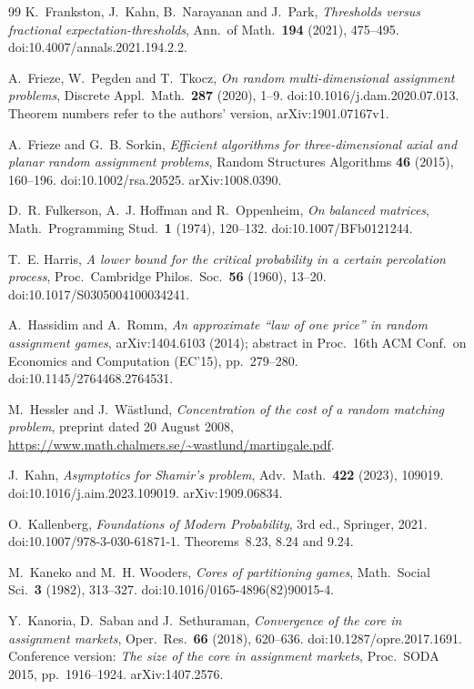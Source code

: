 \documentclass[11pt]{amsart}
\theoremstyle{plain}
\theoremstyle{definition}
\numberwithin{equation}{section}
\begin{document}
\begin{thebibliography}{99}
K.~Frankston, J.~Kahn, B.~Narayanan and J.~Park,
\emph{Thresholds versus fractional expectation-thresholds},
Ann.\ of Math.\ \textbf{194} (2021), 475--495. doi:10.4007/annals.2021.194.2.2.

A.~Frieze, W.~Pegden and T.~Tkocz, \emph{On random multi-dimensional assignment problems},
Discrete Appl.\ Math.\ \textbf{287} (2020), 1--9. doi:10.1016/j.dam.2020.07.013.
Theorem numbers refer to the authors' version, arXiv:1901.07167v1.

A.~Frieze and G.~B. Sorkin, \emph{Efficient algorithms for three-dimensional axial and planar
random assignment problems}, Random Structures Algorithms \textbf{46} (2015), 160--196.
doi:10.1002/rsa.20525. arXiv:1008.0390.

D.~R. Fulkerson, A.~J. Hoffman and R.~Oppenheim, \emph{On balanced matrices}, Math.\
Programming Stud.\ \textbf{1} (1974), 120--132. doi:10.1007/BFb0121244.

T.~E. Harris, \emph{A lower bound for the critical probability in a certain percolation
process}, Proc.\ Cambridge Philos.\ Soc.\ \textbf{56} (1960), 13--20.
doi:10.1017/S0305004100034241.

A.~Hassidim and A.~Romm, \emph{An approximate ``law of one price'' in random assignment
games}, arXiv:1404.6103 (2014); abstract in Proc.\ 16th ACM Conf.\ on Economics and
Computation (EC'15), pp.~279--280. doi:10.1145/2764468.2764531.

M.~Hessler and J.~W\"astlund, \emph{Concentration of the cost of a random matching problem},
preprint dated 20 August 2008, \url{https://www.math.chalmers.se/~wastlund/martingale.pdf}.


J.~Kahn, \emph{Asymptotics for Shamir's problem}, Adv.\ Math.\ \textbf{422} (2023), 109019.
doi:10.1016/j.aim.2023.109019. arXiv:1909.06834.

O.~Kallenberg, \emph{Foundations of Modern Probability}, 3rd ed., Springer, 2021.
doi:10.1007/978-3-030-61871-1. Theorems~8.23, 8.24 and 9.24.

M.~Kaneko and M.~H. Wooders, \emph{Cores of partitioning games}, Math.\ Social Sci.\
\textbf{3} (1982), 313--327. doi:10.1016/0165-4896(82)90015-4.

Y.~Kanoria, D.~Saban and J.~Sethuraman, \emph{Convergence of the core in assignment
markets}, Oper.\ Res.\ \textbf{66} (2018), 620--636. doi:10.1287/opre.2017.1691. Conference
version: \emph{The size of the core in assignment markets}, Proc.\ SODA 2015,
pp.~1916--1924. arXiv:1407.2576.


\end{thebibliography}
\end{document}
